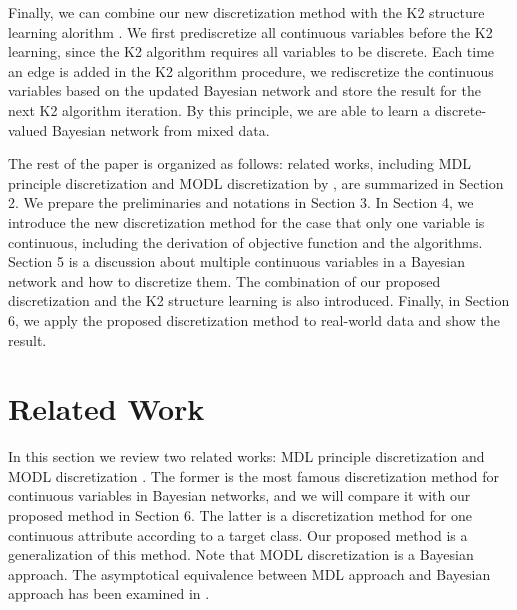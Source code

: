 Finally, we can combine our new discretization method with the K2 structure learning alorithm \citep{K2}. We first prediscretize all continuous variables before the K2 learning, since the K2 algorithm requires all variables to be discrete. Each time an edge is added in the K2 algorithm procedure, we rediscretize the continuous variables based on the updated Bayesian network and store the result for the next K2 algorithm iteration. By this principle, we are able to learn a discrete-valued Bayesian network from mixed data.

The rest of the paper is organized as follows: related works, including MDL principle discretization \citep{Friedman_1996} and MODL discretization by \citet{Boulle_2006}, are summarized in Section 2. We prepare the preliminaries and notations in Section 3. In Section 4, we introduce the new discretization method for the case that only one variable is continuous, including the derivation of objective function and the algorithms. Section 5 is a discussion about multiple continuous variables in a Bayesian network and how to discretize them. The combination of our proposed discretization and the K2 structure learning is also introduced. Finally, in Section 6, we apply the proposed discretization method to real-world data and show the result.

\section{Related Work}
\label{relat_work}
In this section we review two related works: MDL principle discretization \citep{Friedman_1996} and MODL discretization \citep{Boulle_2006}. The former is the most famous discretization method for continuous variables in Bayesian networks, and we will compare it with our proposed method in Section 6. The latter is a discretization method for one continuous attribute according to a target class. Our proposed method is a generalization of this method. Note that MODL discretization is a Bayesian approach. The asymptotical equivalence between MDL approach and Bayesian approach has been examined in \citep{VL_2000}.
